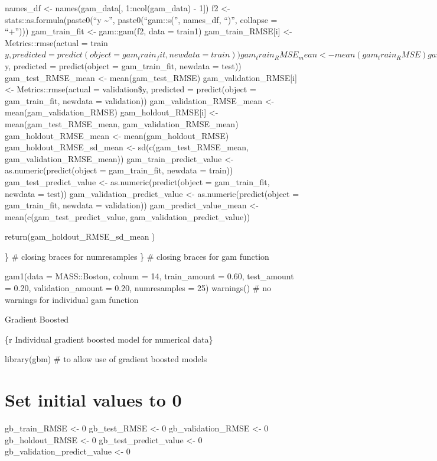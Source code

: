 \documentclass[
]{book}
\begin{document}
names\_df \textless- names(gam\_data{[}, 1:ncol(gam\_data) - 1{]}) f2 \textless-
stats::as.formula(paste0(``y \textasciitilde{}'', paste0(``gam::s('', names\_df, ``)'',
collapse = ``+''))) gam\_train\_fit \textless- gam::gam(f2, data = train1)
gam\_train\_RMSE{[}i{]} \textless- Metrics::rmse(actual =
train\(y, predicted = predict(object = gam_train_fit, newdata = train))
gam_train_RMSE_mean <- mean(gam_train_RMSE)
gam_test_RMSE[i] <- Metrics::rmse(actual = test\)y, predicted =
predict(object = gam\_train\_fit, newdata = test)) gam\_test\_RMSE\_mean \textless-
mean(gam\_test\_RMSE) gam\_validation\_RMSE{[}i{]} \textless- Metrics::rmse(actual =
validation\$y, predicted = predict(object = gam\_train\_fit, newdata =
validation)) gam\_validation\_RMSE\_mean \textless- mean(gam\_validation\_RMSE)
gam\_holdout\_RMSE{[}i{]} \textless- mean(gam\_test\_RMSE\_mean,
gam\_validation\_RMSE\_mean) gam\_holdout\_RMSE\_mean \textless-
mean(gam\_holdout\_RMSE) gam\_holdout\_RMSE\_sd\_mean \textless-
sd(c(gam\_test\_RMSE\_mean, gam\_validation\_RMSE\_mean))
gam\_train\_predict\_value \textless- as.numeric(predict(object = gam\_train\_fit,
newdata = train)) gam\_test\_predict\_value \textless- as.numeric(predict(object =
gam\_train\_fit, newdata = test)) gam\_validation\_predict\_value \textless-
as.numeric(predict(object = gam\_train\_fit, newdata = validation))
gam\_predict\_value\_mean \textless- mean(c(gam\_test\_predict\_value,
gam\_validation\_predict\_value))

return(gam\_holdout\_RMSE\_sd\_mean )

\} \# closing braces for numresamples \} \# closing braces for gam
function

gam1(data = MASS::Boston, colnum = 14, train\_amount = 0.60, test\_amount
= 0.20, validation\_amount = 0.20, numresamples = 25) warnings() \# no
warnings for individual gam function

Gradient Boosted

\{r Individual gradient boosted model for numerical data\}

library(gbm) \# to allow use of gradient boosted models

\chapter{Set initial values to 0}\label{set-initial-values-to-0-6}

gb\_train\_RMSE \textless- 0 gb\_test\_RMSE \textless- 0 gb\_validation\_RMSE \textless- 0
gb\_holdout\_RMSE \textless- 0 gb\_test\_predict\_value \textless- 0
gb\_validation\_predict\_value \textless- 0
\end{document}
